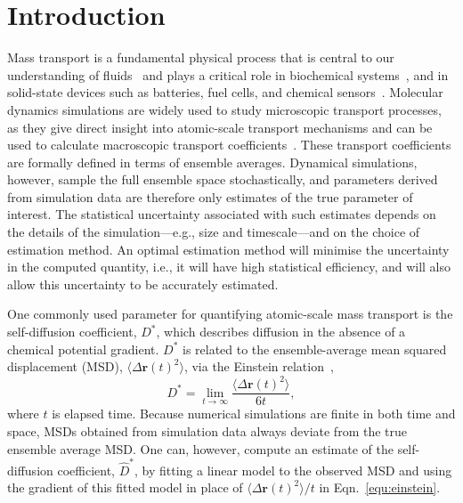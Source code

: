 \documentclass[reprint,superscriptaddress,nobibnotes,amsmath,amssymb,aps,prx,hidelinks,linenumbers]{revtex4-2}
\newcommand{\MSD}[1]{\big\langle\Delta\mathbf{r}{(#1)}^2\big\rangle}
\newcommand{\Dest}{\ensuremath{\widehat{D}^*}}
\newcommand{\D}{\ensuremath{D^*}}
\begin{document}
\section{Introduction}

Mass transport is a fundamental physical process that is central to our understanding of fluids~\cite{sendner_interfacial_2009,shimizu_structural_2015,ghoufi_ultrafast_2016} and plays a critical role in biochemical systems~\cite{maccmmon_dynamics_1977,robertson_diffusion_2006}, and in solid-state devices such as batteries, fuel cells, and chemical sensors~\cite{eames_ionic_2015,morgan_understanding_2011,walsh_taking_2018}.
Molecular dynamics simulations are widely used to study microscopic transport processes, as they give direct insight into atomic-scale transport mechanisms and can be used to calculate macroscopic transport coefficients~\cite{morgan_relationships_2014,morgan_mechanistic_2021,poletayev_defect_2022,klepis_long_2009,wang_application_2011,zelovich_hydroxide_2019}.
These transport coefficients are formally defined in terms of ensemble averages.
Dynamical simulations, however, sample the full ensemble space stochastically, and parameters derived from simulation data are therefore only estimates of the true parameter of interest.
The statistical uncertainty associated with such estimates depends on the details of the simulation---e.g., size and timescale---and on the choice of estimation method.
An optimal estimation method will minimise the uncertainty in the computed quantity, i.e., it will have high statistical efficiency, and will also allow this uncertainty to be accurately estimated.

One commonly used parameter for quantifying atomic-scale mass transport is the self-diffusion coefficient, $\D$, which describes diffusion in the absence of a chemical potential gradient.
$\D$ is related to the ensemble-average mean squared displacement (MSD), $\MSD{t}$, via the Einstein relation~\cite{einstein_uber_1905,helfand_transport_1960},
%
\begin{equation}
    \D = \lim_{t\to\infty}\frac{\MSD{t}}{6t},
    \label{equ:einstein}
\end{equation}
%
where $t$ is elapsed time.
Because numerical simulations are finite in both time and space, MSDs obtained from simulation data always deviate from the true ensemble average MSD.
One can, however, compute an estimate of the self-diffusion coefficient, $\Dest$, by fitting a linear model to the observed MSD and using the gradient of this fitted model in place of $\MSD{t} / t$ in Eqn.~\ref{equ:einstein}.
\end{document}
